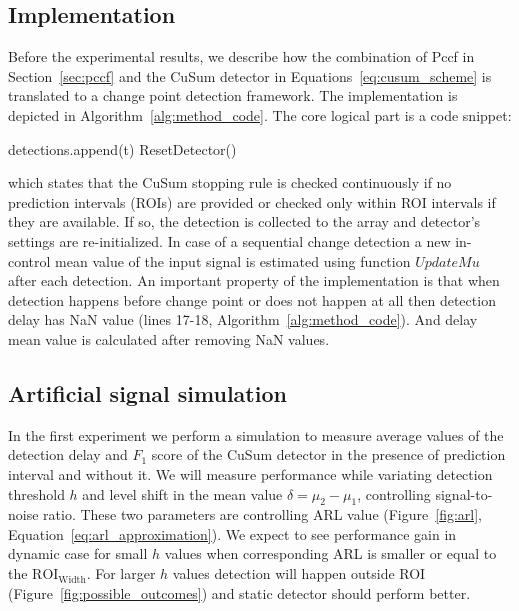 \subsection{Implementation}\label{sec:implementation}
Before the experimental results, we describe how the combination of Pccf in Section~\ref{sec:pccf} and the CuSum detector in Equations~\ref{eq:cusum_scheme} is translated to a change point detection framework.
The implementation is depicted in Algorithm~\ref{alg:method_code}.
The core logical part is a code snippet:
\begin{algorithm}[!h]
	\begin{algorithmic}
            \State detections.append(t)
            \State ResetDetector()
        \EndIf
    \EndIf
	\end{algorithmic}
\end{algorithm}

\noindent
which states that the CuSum stopping rule is checked continuously if no prediction intervals (ROIs) are provided or checked only within ROI intervals if they are available. If so, the detection is collected to the array  and detector's settings are re-initialized. In case of a sequential change detection a new in-control mean value of the input signal is estimated using function $UpdateMu$ after each detection. An important property of the implementation is that  when detection happens before change point or does not happen at all then detection delay has NaN value (lines 17-18, Algorithm~\ref{alg:method_code}). And delay mean value is calculated after removing NaN values.


\subsection{Artificial signal simulation}
In the first experiment we perform a simulation to measure average values of the detection delay and $F_1$ score of the CuSum detector in the presence of prediction interval and without it. We will measure performance while variating detection threshold $h$ and level shift in the mean value $\delta=\mu_2-\mu_1$, controlling signal-to-noise ratio. These two parameters are controlling ARL value (Figure~\ref{fig:arl}, Equation~\ref{eq:arl_approximation}).
We expect to see performance gain in dynamic case for small $h$ values when corresponding ARL is smaller or equal to the $\text{ROI}_{\text{Width}}$. For larger $h$ values detection will happen outside ROI (Figure~\ref{fig:possible_outcomes}) and static detector should perform better. 

